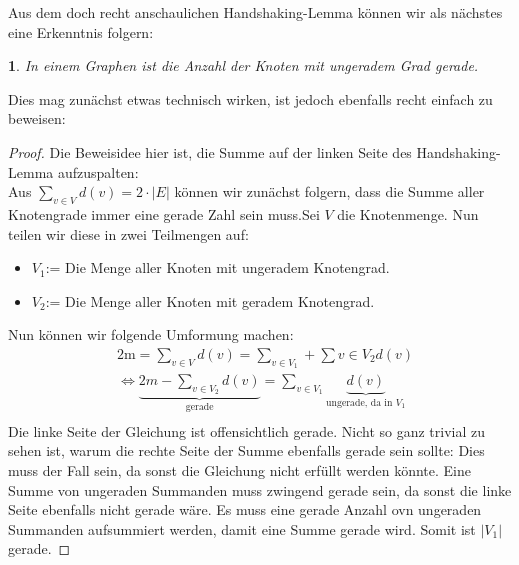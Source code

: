 \documentclass{article}
\theoremstyle{plain}
\newcommand{\thistheoremname}{}
\newtheorem{genericthm}[theorem]{\thistheoremname}
\newenvironment{namedthm}[1]
  {\renewcommand{\thistheoremname}{#1}
   \begin{genericthm}}
  {\end{genericthm}}
\begin{document}
\newpage
Aus dem doch recht anschaulichen Handshaking-Lemma können wir als nächstes eine Erkenntnis folgern:\\
\begin{namedthm}{Lemma}
	In einem Graphen ist die Anzahl der Knoten mit \emph{ungeradem Grad} gerade.\\
\end{namedthm}
\bigskip
Dies mag zunächst etwas technisch wirken, ist jedoch ebenfalls recht einfach zu beweisen:
\begin{proof}
	Die Beweisidee hier ist, die Summe auf der linken Seite des Handshaking-Lemma aufzuspalten:\\
	Aus $\sum_{v \in V}d(v) = 2 \cdot |E|$ können wir zunächst folgern, dass die Summe aller Knotengrade immer eine gerade Zahl sein muss.Sei $V$ die Knotenmenge. Nun teilen wir diese in zwei Teilmengen auf:
		\begin{itemize}
			\item{$V_1$:= Die Menge aller Knoten mit ungeradem Knotengrad.}
			\item{$V_2$:= Die Menge aller Knoten mit geradem Knotengrad.}
		\end{itemize}
	Nun können wir folgende Umformung machen:
		\begin{align*}
			&2\text{m} = \sum_{v \in V}d(v) = \sum_{v \in V_1} + \sum{v \in V_2}d(v)\\
			&\Leftrightarrow \underbrace{2m - \sum_{v \in V_2}d(v)}_{\text{gerade}} = \sum_{v \in V_1}\underbrace{d(v)}_{\text{ungerade, da in $V_1$}}\\
		\end{align*}
	Die linke Seite der Gleichung ist offensichtlich gerade. Nicht so ganz trivial zu sehen ist, warum die rechte Seite der Summe ebenfalls gerade sein sollte: Dies muss der Fall sein, da sonst die Gleichung nicht erfüllt werden könnte. Eine Summe von ungeraden Summanden muss zwingend gerade sein, da sonst die linke Seite ebenfalls nicht gerade wäre. Es muss eine gerade Anzahl ovn ungeraden Summanden aufsummiert werden, damit eine Summe gerade wird. Somit ist $|V_1|$ gerade.
\end{proof}
\newpage
\end{document}
